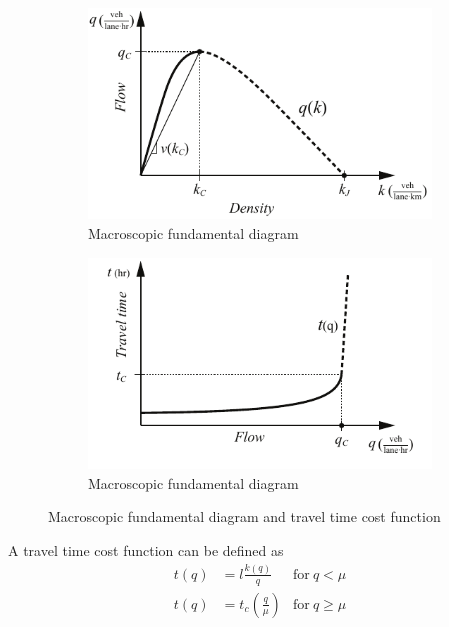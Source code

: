 \documentclass{article}
\begin{document}
\begin{figure}[!ht]
     \centering
     \hfill
     \begin{subfigure}[b]{0.4\textwidth}
         \centering
         \includegraphics[width=\textwidth]{diagram_mfd}
         \caption{Macroscopic fundamental diagram}
         \label{fig:mfd}
     \end{subfigure}
     \hfill
     \begin{subfigure}[b]{0.4\textwidth}
         \centering
         \includegraphics[width=\textwidth]{diagram_traveltime}
        \caption{Macroscopic fundamental diagram}
         \label{fig:traveltime}
     \end{subfigure}
     \hfill
     \caption{Macroscopic fundamental diagram and travel time cost function}
\end{figure}

A travel time cost function can be defined as
\begin{align}
    t(q) &= l \frac{k(q)}{q} & \text{for}~q < \mu \\
    t(q) &= t_c (\frac{q}{\mu})  & \text{for}~q \geq \mu
\end{align}
\end{document}
